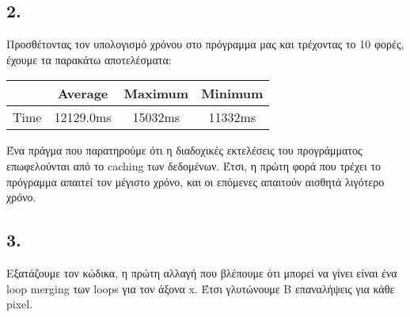 \documentclass{article}
\newcommand{\english}[1]{\foreignlanguage{english}{{#1}}}
\begin{document}
\subsection*{2.}

Προσθέτοντας τον υπολογισμό χρόνου στο πρόγραμμα μας και τρέχοντας το 10 φορές, έχουμε τα παρακάτω αποτελέσματα: \\
\begin{otherlanguage}{english}
    \begin{center}
        \begin{tabular}{|c|c|c|c|}\hline
            & Average & Maximum & Minimum \\ \hline
            Time &  12129.0ms & 15032ms & 11332ms\\ \hline
       \end{tabular}
    \end{center}
    \end{otherlanguage}

    Ένα πράγμα που παρατηρούμε ότι η διαδοχικές εκτελέσεις του προγράμματος επωφελούνται από το \english{caching} των δεδομένων. Έτσι, η πρώτη φορά που τρέχει το πρόγραμμα απαιτεί τον μέγιστο χρόνο, και οι επόμενες απαιτούν αισθητά λιγότερο χρόνο. 

\subsection*{3.}

Εξατάζουμε τον κώδικα, η πρώτη αλλαγή που βλέπουμε ότι μπορεί να γίνει είναι ένα \english{loop merging} των loops για τον άξονα x. Έτσι γλυτώνουμε \english{B} επαναλήψεις για κάθε \english{pixel}.
\end{document}
